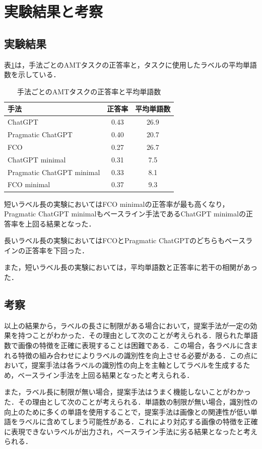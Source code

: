 \documentclass[a4paper,11pt]{jreport}
\begin{document}
\section{実験結果と考察}

\subsection{実験結果}

表\ref{tab:accuracy_result}は，手法ごとのAMTタスクの正答率と，タスクに使用したラベルの平均単語数を示している．

\begin{table}[H]
\centering
\begin{tabular}{lcc}
\hline
手法 & 正答率 & 平均単語数 \\
\hline
ChatGPT & 0.43 & 26.9 \\
Pragmatic ChatGPT & 0.40 & 20.7 \\
FCO & 0.27 & 26.7 \\
ChatGPT minimal & 0.31 & 7.5 \\
Pragmatic ChatGPT minimal & 0.33 & 8.1 \\
FCO minimal & 0.37 & 9.3 \\
\hline
\end{tabular}
\caption{手法ごとのAMTタスクの正答率と平均単語数}
\label{tab:accuracy_result}
\end{table}

短いラベル長の実験においてはFCO minimalの正答率が最も高くなり，Pragmatic ChatGPT minimalもベースライン手法であるChatGPT minimalの正答率を上回る結果となった．

長いラベル長の実験においてはFCOとPragmatic ChatGPTのどちらもベースラインの正答率を下回った．

また，短いラベル長の実験においては，平均単語数と正答率に若干の相関があった．

\subsection{考察}
以上の結果から，ラベルの長さに制限がある場合において，提案手法が一定の効果を持つことがわかった．その理由として次のことが考えられる．限られた単語数で画像の特徴を正確に表現することは困難である．この場合，各ラベルに含まれる特徴の組み合わせによりラベルの識別性を向上させる必要がある．この点において，提案手法は各ラベルの識別性の向上を主軸としてラベルを生成するため，ベースライン手法を上回る結果となったと考えられる．


また，ラベル長に制限が無い場合，提案手法はうまく機能しないことがわかった．その理由として次のことが考えられる．単語数の制限が無い場合，識別性の向上のために多くの単語を使用することで，提案手法は画像との関連性が低い単語をラベルに含めてしまう可能性がある．これにより対応する画像の特徴を正確に表現できないラベルが出力され，ベースライン手法に劣る結果となったと考えられる．
\end{document}
